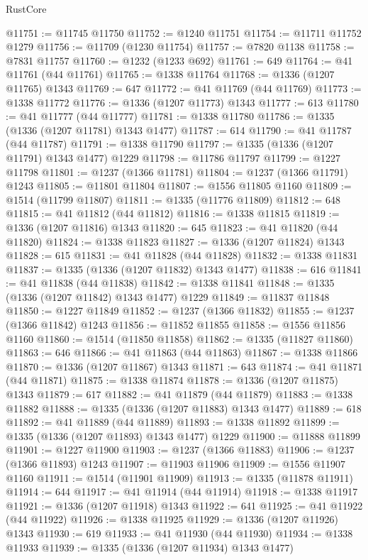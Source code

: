 \begin{lexlean}{RustCore}
\begin{coremodule}
@11751 := @11745 @11750
@11752 := @1240 @11751
@11754 := @11711 @11752 @1279
@11756 := @11709 (@1230 @11754)
@11757 := @7820 @1138
@11758 := @7831 @11757
@11760 := @1232 (@1233 @692)
@11761 := 649
@11764 := @41 @11761 (@44 @11761)
@11765 := @1338 @11764
@11768 := @1336 (@1207 @11765) @1343
@11769 := 647
@11772 := @41 @11769 (@44 @11769)
@11773 := @1338 @11772
@11776 := @1336 (@1207 @11773) @1343
@11777 := 613
@11780 := @41 @11777 (@44 @11777)
@11781 := @1338 @11780
@11786 := @1335 (@1336 (@1207 @11781) @1343 @1477)
@11787 := 614
@11790 := @41 @11787 (@44 @11787)
@11791 := @1338 @11790
@11797 := @1335 (@1336 (@1207 @11791) @1343 @1477) @1229
@11798 := @11786 @11797
@11799 := @1227 @11798
@11801 := @1237 (@1366 @11781)
@11804 := @1237 (@1366 @11791) @1243
@11805 := @11801 @11804
@11807 := @1556 @11805 @1160
@11809 := @1514 (@11799 @11807)
@11811 := @1335 (@11776 @11809)
@11812 := 648
@11815 := @41 @11812 (@44 @11812)
@11816 := @1338 @11815
@11819 := @1336 (@1207 @11816) @1343
@11820 := 645
@11823 := @41 @11820 (@44 @11820)
@11824 := @1338 @11823
@11827 := @1336 (@1207 @11824) @1343
@11828 := 615
@11831 := @41 @11828 (@44 @11828)
@11832 := @1338 @11831
@11837 := @1335 (@1336 (@1207 @11832) @1343 @1477)
@11838 := 616
@11841 := @41 @11838 (@44 @11838)
@11842 := @1338 @11841
@11848 := @1335 (@1336 (@1207 @11842) @1343 @1477) @1229
@11849 := @11837 @11848
@11850 := @1227 @11849
@11852 := @1237 (@1366 @11832)
@11855 := @1237 (@1366 @11842) @1243
@11856 := @11852 @11855
@11858 := @1556 @11856 @1160
@11860 := @1514 (@11850 @11858)
@11862 := @1335 (@11827 @11860)
@11863 := 646
@11866 := @41 @11863 (@44 @11863)
@11867 := @1338 @11866
@11870 := @1336 (@1207 @11867) @1343
@11871 := 643
@11874 := @41 @11871 (@44 @11871)
@11875 := @1338 @11874
@11878 := @1336 (@1207 @11875) @1343
@11879 := 617
@11882 := @41 @11879 (@44 @11879)
@11883 := @1338 @11882
@11888 := @1335 (@1336 (@1207 @11883) @1343 @1477)
@11889 := 618
@11892 := @41 @11889 (@44 @11889)
@11893 := @1338 @11892
@11899 := @1335 (@1336 (@1207 @11893) @1343 @1477) @1229
@11900 := @11888 @11899
@11901 := @1227 @11900
@11903 := @1237 (@1366 @11883)
@11906 := @1237 (@1366 @11893) @1243
@11907 := @11903 @11906
@11909 := @1556 @11907 @1160
@11911 := @1514 (@11901 @11909)
@11913 := @1335 (@11878 @11911)
@11914 := 644
@11917 := @41 @11914 (@44 @11914)
@11918 := @1338 @11917
@11921 := @1336 (@1207 @11918) @1343
@11922 := 641
@11925 := @41 @11922 (@44 @11922)
@11926 := @1338 @11925
@11929 := @1336 (@1207 @11926) @1343
@11930 := 619
@11933 := @41 @11930 (@44 @11930)
@11934 := @1338 @11933
@11939 := @1335 (@1336 (@1207 @11934) @1343 @1477)

\end{coremodule}
\end{lexlean}
